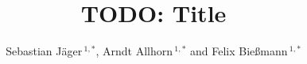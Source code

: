 \documentclass[utf8]{frontiersSCNS} %
\def\firstAuthorLast{Sample {et~al.}} %
\def\Authors{Sebastian Jäger\,$^{1,*}$, Arndt Allhorn\,$^{1,*}$ and Felix Bießmann\,$^{1,*}$}
\begin{document}
\onecolumn
{}

\title[TODO: Title]{TODO: Title}

\author[\firstAuthorLast ]{\Authors} %
\address{} %
\correspondance{} %

\extraAuth{}%


\maketitle
















\end{document}
